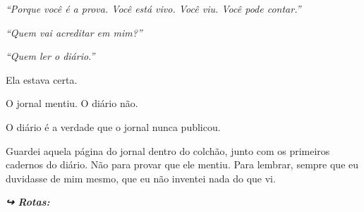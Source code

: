 \noindent \textit{\textquotedblleft{}Porque você é a prova. Você está vivo. Você viu. Você pode contar.\textquotedblright{}}

\noindent \textit{\textquotedblleft{}Quem vai acreditar em mim?\textquotedblright{}}

\noindent \textit{\textquotedblleft{}Quem ler o diário.\textquotedblright{}}

\noindent Ela estava certa.

\noindent O jornal mentiu.
O diário não.

\noindent O diário é a verdade que o jornal nunca publicou.

\noindent Guardei aquela página do jornal dentro do colchão, junto com os primeiros cadernos do diário. Não para provar que ele mentiu. Para lembrar, sempre que eu duvidasse de mim mesmo, que eu não inventei nada do que vi.

\vspace{0.5em}
\noindent\textit{\textbf{↪ Rotas:}  \rotasep {}}